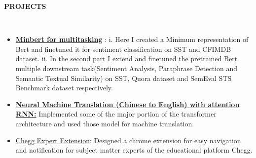 \documentclass[a4paper,10pt]{article}
\newcommand{\lsep}{-0.5cm}
\newcommand{\resheading}[1]{{\small \colorbox{mygrey}{\begin{minipage}{0.975\textwidth}{\textbf{#1 \vphantom{p\^{E}}}}\end{minipage}}}}
\begin{document}
\resheading{\textbf{PROJECTS} }\\[\lsep]
\begin{itemize}
\setlength\itemsep{0.2em}
\item \href{https://github.com/soumitrapy/minbert-default-final-project}{\textbf{Minbert for multitasking}} : i. Here I created a Minimum representation of Bert and finetuned it for sentiment classification on SST and CFIMDB dataset. ii. In the second part I extend and finetuned the pretrained Bert multiple downstream task(Sentiment Analysis, Paraphrase Detection and Semantic Textual Similarity) on  SST, Quora dataset and SemEval STS Benchmark dataset respectively.
\item \href{https://github.com/soumitrapy/cs224n/tree/main/a4/student}{\textbf{Neural Machine Translation (Chinese to English) with attention RNN:}} Implemented some of the major portion of the transformer architecture and used those model for machine translation. 
\item \href{https://github.com/soumitrapy/CheggExtension}{Chegg Expert Extension}: Designed a chrome extension for easy navigation and notification for subject matter experts of the educational platform Chegg.

\end{itemize}
\end{document}
